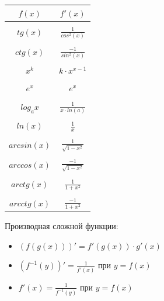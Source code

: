 \documentclass[oneside]{book}
\begin{document}
\begin{enumerate}
\begin{center}
      \begin{tabular}{c|c}
        $f(x)$ & $f'(x)$ \\
        \hline \\
        $tg(x)$ & $\frac{1}{cos^2(x)}$ \\
          \hline \\
        $ctg(x)$ & $\frac{-1}{sin^2(x)}$ \\
          \hline \\
        $x^k$ & $k \cdot x^{x-1}$ \\
          \hline \\
        $e^x$ & $e^x$ \\
          \hline \\
        $log_a x$ & $\frac{1}{x \cdot ln(a)}$ \\
          \hline \\
        $ln(x)$ & $\frac{1}{x}$ \\
          \hline \\
        $arcsin(x)$ & $\frac{1}{\sqrt{1 - x^2}}$ \\
          \hline \\
        $arccos(x)$ & $\frac{-1}{\sqrt{1 - x^2}}$ \\
          \hline \\
        $arctg(x)$ & $\frac{1}{1 + x^2}$ \\
          \hline \\
        $arcctg(x)$ & $\frac{-1}{1 + x^2}$ \\
      \end{tabular}
  \end{center}
Производная сложной функции:
\begin{itemize}
  \item $(f(g(x)))' = f'(g(x)) \cdot g'(x)$
  \item $(f^{-1}(y))' = \frac{1}{f'(x)}$ при $y = f(x)$
  \item $f'(x) = \frac{1}{f^{-1}(y)}$ при $y = f(x)$
\end{itemize}

\end{enumerate}
\end{document}
